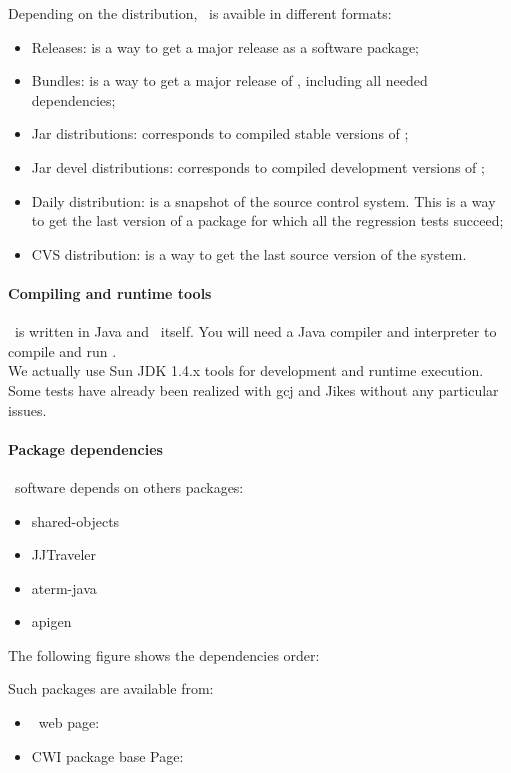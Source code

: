 Depending on the distribution, \TOM\ is avaible in different formats:
\begin{itemize}
\item Releases: is a way to get a major release as a software package;
\item Bundles: is  a way to get a major release of \TOM, including all
  needed dependencies;
\item Jar distributions: corresponds to compiled stable versions of \TOM;
\item Jar devel distributions: corresponds to compiled development versions of \TOM;
\item Daily distribution: is a snapshot of the source control
  system. This is a way to get the last version of a package for which
  all the regression tests succeed;

\item CVS distribution: is a way to get the last source version of the
  system.
\end{itemize}

\paragraph{Compiling and runtime tools}
\TOM\ is written in Java and \TOM\ itself. You will need a Java
compiler and interpreter to compile and run \TOM. 
\\We actually use Sun JDK 1.4.x tools for development and runtime execution.
\\Some tests have already been realized with gcj
and Jikes without any particular issues.

\paragraph{Package dependencies}
\TOM\ software depends on others packages:
\begin{itemize}
\item shared-objects
\item JJTraveler
\item aterm-java
\item apigen
\end{itemize}
The following figure shows the dependencies order:


Such packages are available from:
\begin{itemize}
\item \TOM\ web page:~
\item CWI package base Page:~
\end{itemize}    


